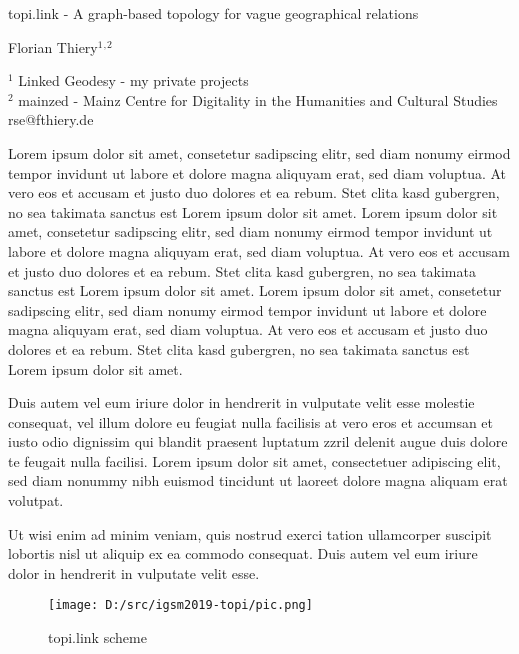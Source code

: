 \documentclass[a4paper]{article}
\begin{document}

\Large
 \begin{center}
topi.link - A graph-based topology for vague geographical relations\\ 

\hspace{10pt}

\large
Florian Thiery$^1$$^,$$^2$\\

\hspace{10pt}

\small  
$^1$ Linked Geodesy - my private projects\\
$^2$ mainzed - Mainz Centre for Digitality in the Humanities and Cultural Studies\\
rse@fthiery.de\\

\end{center}

\normalsize

Lorem ipsum dolor sit amet, consetetur sadipscing elitr, sed diam nonumy eirmod tempor invidunt ut labore et dolore magna aliquyam erat, sed diam voluptua. At vero eos et accusam et justo duo dolores et ea rebum. Stet clita kasd gubergren, no sea takimata sanctus est Lorem ipsum dolor sit amet. Lorem ipsum dolor sit amet, consetetur sadipscing elitr, sed diam nonumy eirmod tempor invidunt ut labore et dolore magna aliquyam erat, sed diam voluptua. At vero eos et accusam et justo duo dolores et ea rebum. Stet clita kasd gubergren, no sea takimata sanctus est Lorem ipsum dolor sit amet. Lorem ipsum dolor sit amet, consetetur sadipscing elitr, sed diam nonumy eirmod tempor invidunt ut labore et dolore magna aliquyam erat, sed diam voluptua. At vero eos et accusam et justo duo dolores et ea rebum. Stet clita kasd gubergren, no sea takimata sanctus est Lorem ipsum dolor sit amet.   

Duis autem vel eum iriure dolor in hendrerit in vulputate velit esse molestie consequat, vel illum dolore eu feugiat nulla facilisis at vero eros et accumsan et iusto odio dignissim qui blandit praesent luptatum zzril delenit augue duis dolore te feugait nulla facilisi. Lorem ipsum dolor sit amet, consectetuer adipiscing elit, sed diam nonummy nibh euismod tincidunt ut laoreet dolore magna aliquam erat volutpat.   

Ut wisi enim ad minim veniam, quis nostrud exerci tation ullamcorper suscipit lobortis nisl ut aliquip ex ea commodo consequat. Duis autem vel eum iriure dolor in hendrerit in vulputate velit esse.


\begin{figure}[!htb]
	\centering
		\texttt{[image: D:/src/igsm2019-topi/pic.png]}
	\caption{topi.link scheme}
	\label{fig:amt_pic_new}
\end{figure}
\end{document}
